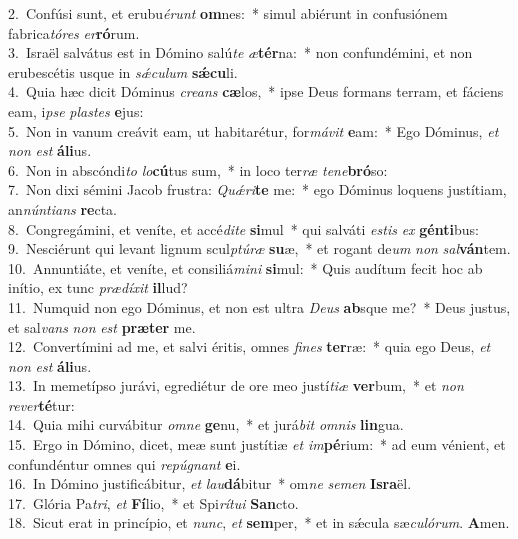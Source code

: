 {2.~}Confúsi sunt, et erubu\textit{é}\textit{runt} \textbf{om}nes:~* simul abiérunt in confusiónem fabrica\textit{tó}\textit{res} \textit{er}\textbf{ró}rum.\\
{3.~}Israël salvátus est in Dómino salú\textit{te} \textit{æ}\textbf{tér}na:~* non confundémini, et non erubescétis usque in \textit{sǽ}\textit{cu}\textit{lum} \textbf{sǽ}\textbf{cu}li.\\
{4.~}Quia hæc dicit Dóminus \textit{cre}\textit{ans} \textbf{cæ}los,~* ipse Deus formans terram, et fáciens eam, i\textit{pse} \textit{pla}\textit{stes} \textbf{e}jus:\\
{5.~}Non in vanum creávit eam, ut habitarétur, for\textit{má}\textit{vit} \textbf{e}am:~* Ego Dóminus, \textit{et} \textit{non} \textit{est} \textbf{á}\textbf{li}us.\\
{6.~}Non in abscóndi\textit{to} \textit{lo}\textbf{cú}tus sum,~* in loco ter\textit{ræ} \textit{te}\textit{ne}\textbf{bró}so:\\
{7.~}Non dixi sémini Jacob frustra: \textit{Quǽ}\textit{ri}\textbf{te} me:~* ego Dóminus loquens justítiam, an\textit{nún}\textit{ti}\textit{ans} \textbf{re}cta.\\
{8.~}Congregámini, et veníte, et accé\textit{di}\textit{te} \textbf{si}mul~* qui salváti \textit{e}\textit{stis} \textit{ex} \textbf{gén}\textbf{ti}bus:\\
{9.~}Nesciérunt qui levant lignum scul\textit{ptú}\textit{ræ} \textbf{su}æ,~* et rogant de\textit{um} \textit{non} \textit{sal}\textbf{ván}tem.\\
{10.~}Annuntiáte, et veníte, et consiliá\textit{mi}\textit{ni} \textbf{si}mul:~* Quis audítum fecit hoc ab inítio, ex tunc \textit{præ}\textit{dí}\textit{xit} \textbf{il}lud?\\
{11.~}Numquid non ego Dóminus, et non est ultra \textit{De}\textit{us} \textbf{ab}sque me?~* Deus justus, et sal\textit{vans} \textit{non} \textit{est} \textbf{præ}\textbf{ter} me.\\
{12.~}Convertímini ad me, et salvi éritis, omnes \textit{fi}\textit{nes} \textbf{ter}ræ:~* quia ego Deus, \textit{et} \textit{non} \textit{est} \textbf{á}\textbf{li}us.\\
{13.~}In memetípso jurávi, egrediétur de ore meo justí\textit{ti}\textit{æ} \textbf{ver}bum,~* et \textit{non} \textit{re}\textit{ver}\textbf{té}tur:\\
{14.~}Quia mihi curvábitur \textit{om}\textit{ne} \textbf{ge}nu,~* et jurá\textit{bit} \textit{om}\textit{nis} \textbf{lin}gua.\\
{15.~}Ergo in Dómino, dicet, meæ sunt justítiæ \textit{et} \textit{im}\textbf{pé}rium:~* ad eum vénient, et confundéntur omnes qui \textit{re}\textit{pú}\textit{gnant} \textbf{e}i.\\
{16.~}In Dómino justificábitur, \textit{et} \textit{lau}\textbf{dá}bitur~* om\textit{ne} \textit{se}\textit{men} \textbf{Is}\textbf{ra}ël.\\
{17.~}Glória Pa\textit{tri}, \textit{et} \textbf{Fí}lio,~* et Spi\textit{rí}\textit{tu}\textit{i} \textbf{San}cto.\\
{18.~}Sicut erat in princípio, et \textit{nunc}, \textit{et} \textbf{sem}per,~* et in sǽcula sæ\textit{cu}\textit{ló}\textit{rum}. \textbf{A}men.\\
